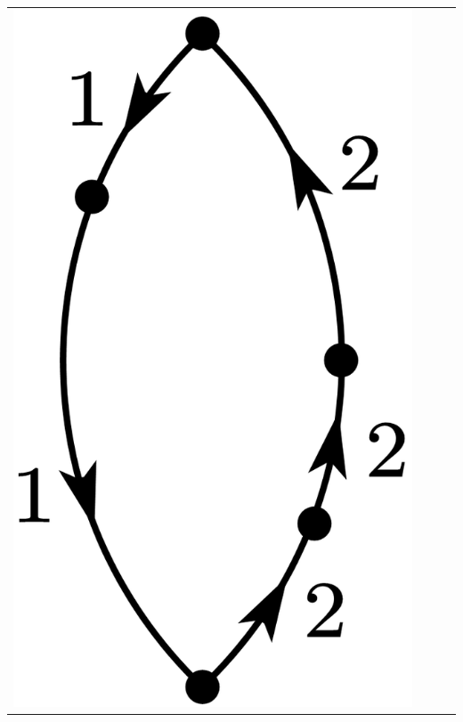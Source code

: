 \documentclass[a4paper]{book}
\newcounter{solution}[chapter]
\begin{document}
\begin{solution}
\begin{center}
\begin{tabular}{cccc}
		\begin{minipage}{0.22\linewidth}
		\centering
		\includegraphics[scale=1.0,trim=0 -4 0 -4]{./pictures/6.01/7.png}
		\captionof*{figure}{$\displaystyle (-1)^{2+1} \frac{ V_{11} V_{12} V_{21} V^2_{22} }{ ( E^{(0)}_1 - E^{(0)}_2)^4 }$}
		\end{minipage} &
		

\end{tabular}
\end{center}
\end{solution}
\end{document}
